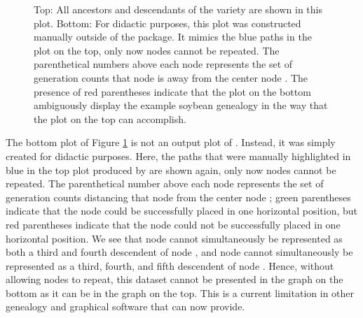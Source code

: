\documentclass[article,shortnames]{jss}
\begin{document}
\begin{figure}[H]
    \centering
    \caption{Top: All ancestors and descendants of the variety  are shown in this  plot. Bottom: For didactic purposes, this plot was constructed manually outside of the  package. It mimics the blue paths in the  plot on the top, only now nodes cannot be repeated. The parenthetical numbers above each node represents the set of generation counts that node is away from the center node . The presence of red parentheses indicate that the plot on the bottom ambiguously display the example soybean genealogy in the way that the  plot on the top can accomplish.}
    \label{fig:Lee}
\end{figure}

The bottom plot of Figure \ref{fig:Lee} is not an output plot of . Instead, it was simply created for didactic purposes. Here, the paths that were manually highlighted in blue in the top plot produced by  are shown again, only now nodes cannot be repeated. The parenthetical number above each node represents the set of generation counts distancing that node from the center node ; green parentheses indicate that the node could be successfully placed in one horizontal position, but red parentheses indicate that the node could not be successfully placed in one horizontal position. We see that node  cannot simultaneously be represented as both a third and fourth descendent of node , and node  cannot simultaneously be represented as a third, fourth, and fifth descendent of node . Hence, without allowing nodes to repeat, this dataset cannot be presented in the graph on the bottom as it can be in the  graph on the top. This is a current limitation in other genealogy and graphical software that  can now provide.
\end{document}
